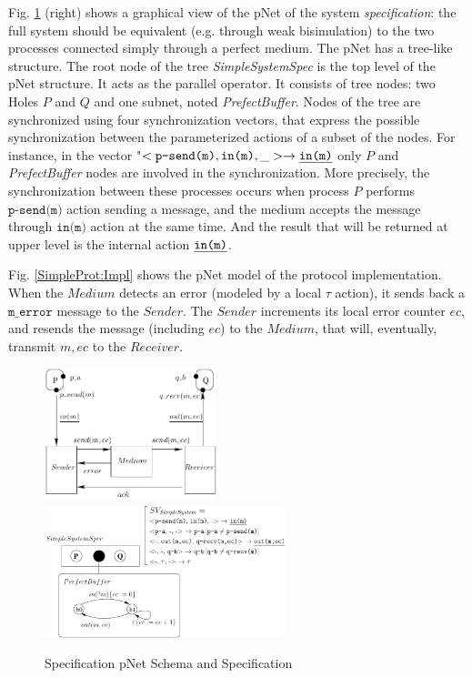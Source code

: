 \documentclass{lmcs}
\begin{document}
Fig. \ref{SimpleProt:Spec} (right) shows a graphical view of the pNet of the system \emph{specification}:
the full system should be equivalent (e.g. through weak bisimulation)
to the two processes connected simply through a perfect medium.  
The pNet has a tree-like structure.  The root node of the tree {\it SimpleSystemSpec} is the top level of the pNet structure. It acts as the parallel operator. It consists of tree nodes: two Holes $P$ and $Q$ and one subnet, noted {\it PrefectBuffer}. Nodes of the tree are synchronized using four synchronization vectors, that  express the possible synchronization between the parameterized actions of a subset of the nodes. For instance, in the vector "$< \texttt{p-send(m)},\texttt{in(m)},\_> \rightarrow \texttt{\underline{in(m)}}$ only $P$ and {\it PrefectBuffer} nodes are involved in the synchronization. More precisely, the synchronization between these processes occurs when  process $P$  performs $\texttt{p-send(m)}$  action sending a message, and  the medium accepts the message through $\texttt{in(m)}$ action  at the same time. And the result that will be returned at upper level is the internal action  $\texttt{\underline{in(m)}}$.


Fig. \ref{SimpleProt:Impl} shows the pNet model of the protocol implementation. When the $Medium$ detects an error (modeled by a local $\tau$ action), it sends back a $\texttt{m\_error}$ message to the $Sender$. The $Sender$ increments its local error counter $ec$, and resends the message (including $ec$) to the $Medium$, that will, eventually, transmit $m,ec$ to the $Receiver$.

\begin{figure}[t]
   \includegraphics[width=5cm]{XFIG/SimpleProt-Schema}
   \includegraphics[width=7cm]{XFIG/SimpleProt2-Spec}
   \caption{Specification pNet Schema and Specification}
   \label{SimpleProt:Spec}

\end{figure}
\end{document}
